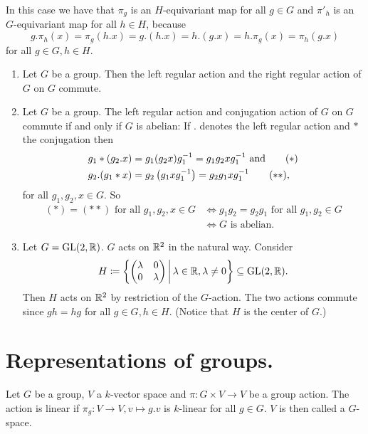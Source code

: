 \begin{rem}
 In this case we have that $\pi_g$ is an $H$-equivariant map for all $g \in G$ and $\pi'_h$ is an $G$-equivariant map for all $h \in H$, because
 \[
  g.\pi_h(x) = \pi_g(h.x) = g.(h.x) = h.(g.x) = h.\pi_g(x) = \pi_h(g.x)
 \]
 for all $g \in G, h \in H$.
\end{rem}


\begin{expls}
 \begin{enumerate}[label=\emph{\alph*)},leftmargin=*]
  \item
   Let $G$ be a group. Then the left regular action and the right regular action of $G$ on $G$ commute.
  \item
   Let $G$ be a group. The left regular action and conjugation action of $G$ on $G$ commute if and only if $G$ is abelian: If $.$ denotes the left regular action and $*$ the conjugation then
   \begin{align*}
    g_1*(g_2.x) &= g_1 (g_2 x) g_1^{-1} = g_1 g_2 x g_1^{-1} \text{ and} \tag{\ensuremath{\ast}}\\
    g_2.(g_1*x) &= g_2 \left(g_1 x g_1^{-1}\right) = g_2 g_1 x g_1^{-1} \tag{\ensuremath{\ast\ast}},
   \end{align*}
   for all $g_1, g_2, x \in G$. So
   \begin{align*}
    (\ast) = (\ast\ast) \text{ for all } g_1, g_2, x \in G
    &\Leftrightarrow g_1 g_2 = g_2 g_1 \text{ for all } g_1, g_2 \in G \\
    &\Leftrightarrow \text{$G$ is abelian}.
   \end{align*}
  \item
   Let $G = \operatorname{GL}(2,\mathbb{R})$. $G$ acts on $\mathbb{R}^2$ in the natural way. Consider
   \[
    H \coloneqq \left\{ \begin{pmatrix}\lambda&0\\0&\lambda\end{pmatrix} \,\middle|\, \lambda \in \mathbb{R}, \lambda \neq 0 \right\} \subseteq \operatorname{GL}(2,\mathbb{R}).
   \]
   Then $H$ acts on $\mathbb{R}^2$ by restriction of the $G$-action. The two actions commute since $gh = hg$ for all $g \in G, h \in H$. (Notice that $H$ is the center of $G$.)
 \end{enumerate}
\end{expls}





\section{Representations of groups.}


\begin{defi}
 Let $G$ be a group, $V$ a $k$-vector space and $\pi \colon G \times V \to V$ be a group action. The action is linear if $\pi_g \colon V \to V, v \mapsto g.v$ is $k$-linear for all $g \in G$. $V$ is then called a $G$-space.
\end{defi}


